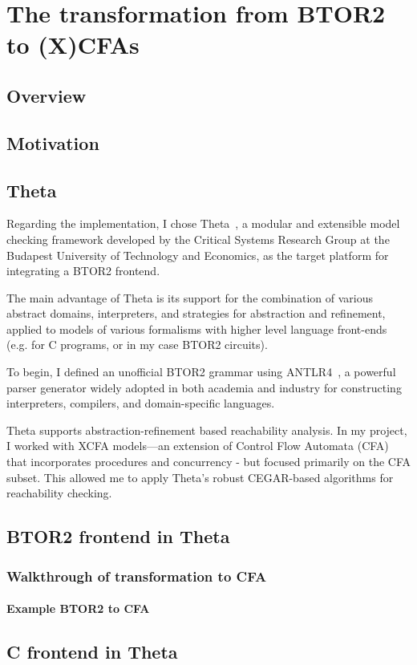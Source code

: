 \chapter{The transformation from BTOR2 to (X)CFAs }

\section{Overview}

\section{Motivation}\label{sec:motivation}

\section{Theta}\label{sec:theta}

Regarding the implementation, I chose Theta~\cite{theta}, a modular and extensible model checking framework developed by the Critical Systems Research Group at the Budapest University of Technology and Economics, as the target platform for integrating a BTOR2 frontend.

The main advantage of Theta is its support for the combination of various abstract domains, interpreters, and strategies for abstraction and refinement, applied to models of various formalisms with higher level language front-ends (e.g. for C programs, or in my case BTOR2 circuits).

To begin, I defined an unofficial BTOR2 grammar using ANTLR4~\cite{antlr}, a powerful parser generator widely adopted in both academia and industry for constructing interpreters, compilers, and domain-specific languages.

Theta supports abstraction-refinement based reachability analysis. In my project, I worked with XCFA models—an extension of Control Flow Automata (CFA) that incorporates procedures and concurrency - but focused primarily on the CFA subset. This allowed me to apply Theta's robust CEGAR-based algorithms for reachability checking.



\section{BTOR2 frontend in Theta}


\subsection{Walkthrough of transformation to CFA}

\subsubsection{Example BTOR2 to CFA}

\section{C frontend in Theta}

